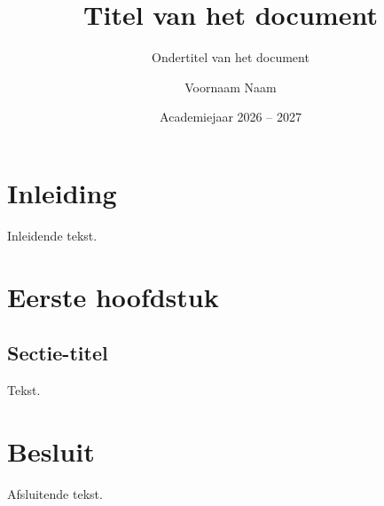 \documentclass[twoside, kulak]{kulakreport} %
\title{Titel van het document}
\subtitle{Ondertitel van het document}
\author{Voornaam Naam}
\date{Academiejaar 2026 -- 2027}
\institute{Naam van de opleiding}
\begin{document}
\titlepage

\tableofcontents

\chapter*{Inleiding}
Inleidende tekst.

\chapter{Eerste hoofdstuk}
\section{Sectie-titel}
Tekst.

\chapter*{Besluit}
Afsluitende tekst.
\end{document}

